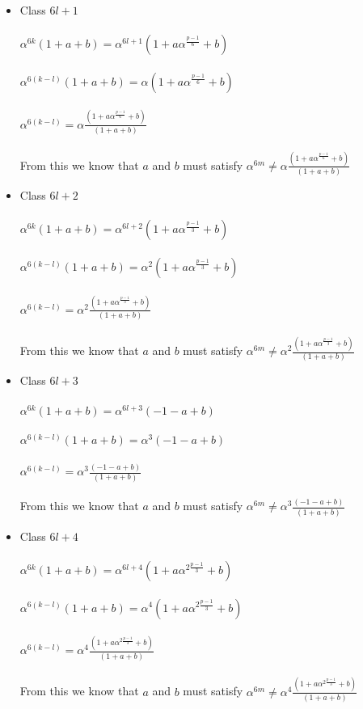 \documentclass[12pt]{article}
\begin{document}
\begin{itemize}
	\item Class $6l+1$ \\ \\
		$\alpha^{6k}(1+a+b) = \alpha^{6l+1}(1+a\alpha^{\frac{p-1}{6}}+b)$
		\\ \\
		$\alpha^{6(k-l)}(1+a+b) = \alpha(1+a\alpha^{\frac{p-1}{6}}+b)$
		\\ \\
		$\alpha^{6(k-l)} =  \alpha \frac{(1+a\alpha^{\frac{p-1}{6}}+b)}{(1+a+b)} $
		\\ \\
		From this we know that $a$ and $b$ must satisfy
		 $\alpha^{6m} \neq  \alpha \frac{(1+a\alpha^{\frac{p-1}{6}}+b)}{(1+a+b)} $

	\item Class $6l+2$ \\ \\
		$\alpha^{6k}(1+a+b) = \alpha^{6l+2}(1+a\alpha^{\frac{p-1}{3}}+b)$
		\\ \\
		$\alpha^{6(k-l)}(1+a+b) = \alpha^{2}(1+a\alpha^{\frac{p-1}{3}}+b)$
		\\ \\
		$\alpha^{6(k-l)} = \alpha^{2}\frac{(1+a\alpha^{\frac{p-1}{3}}+b)}{(1+a+b)}$
		\\ \\
		From this we know that $a$ and $b$ must satisfy
		$\alpha^{6m} \neq \alpha^{2}\frac{(1+a\alpha^{\frac{p-1}{3}}+b)}{(1+a+b)}$

	\item Class $6l+3$ \\ \\
		$\alpha^{6k}(1+a+b) = \alpha^{6l+3}(-1-a+b)$
		\\ \\
		$\alpha^{6(k-l)}(1+a+b) = \alpha^{3}(-1-a+b)$
		\\ \\
		$\alpha^{6(k-l)} = \alpha^{3}\frac{(-1-a+b)}{(1+a+b)}$
		\\ \\
		From this we know that $a$ and $b$ must satisfy
		$\alpha^{6m} \neq \alpha^{3}\frac{(-1-a+b)}{(1+a+b)}$
	
	\item Class $6l+4$ \\ \\
		$\alpha^{6k}(1+a+b) = \alpha^{6l+4}(1+a\alpha^{2\frac{p-1}{3}}+b)$
		\\ \\
		$\alpha^{6(k-l)}(1+a+b) = \alpha^{4}(1+a\alpha^{2\frac{p-1}{3}}+b)$
		\\ \\
		$\alpha^{6(k-l)} = \alpha^{4}\frac{(1+a\alpha^{2\frac{p-1}{3}}+b)}{(1+a+b)}$
		\\ \\
		From this we know that $a$ and $b$ must satisfy $\alpha^{6m} \neq \alpha^{4}\frac{(1+a\alpha^{2\frac{p-1}{3}}+b)}{(1+a+b)}$


\end{itemize}
\end{document}
